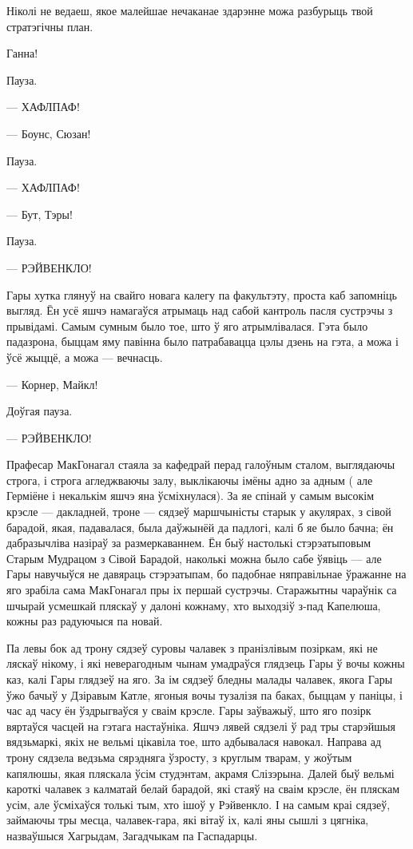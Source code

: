 

\begin{chapterOpeningQuote}
Ніколі не ведаеш, якое
малейшае нечаканае здарэнне можа разбурыць твой стратэгічны план.
\end{chapterOpeningQuote}

 Ганна!

\hplettrineextrapara
Пауза.

--- ХАФЛПАФ!

--- Боунс, Сюзан!

Пауза.

--- ХАФЛПАФ!

--- Бут, Тэры!

Пауза.

--- РЭЙВЕНКЛО!

Гары хутка глянуў на свайго новага калегу па факультэту, проста каб запомніць выгляд.
Ён усё яшчэ намагаўся атрымаць над сабой кантроль пасля сустрэчы з прывідамі. 
Самым сумным было тое, што ў яго атрымлівалася. Гэта было падазрона,
быццам яму павінна было патрабавацца цэлы дзень на гэта, а можа і ўсё жыццё, а можа --- вечнасць.


--- Корнер, Майкл!

Доўгая пауза.

--- РЭЙВЕНКЛО!

Прафесар МакГонагал стаяла за кафедрай перад галоўным сталом, выглядаючы
строга, і строга агледжваючы залу, выклікаючы імёны адно за адным (%
але Герміёне і некалькім яшчэ яна ўсміхнулася).
За яе спінай у самым высокім крэсле --- дакладней, троне --- 
сядзеў маршчыністы старык у акулярах, з сівой барадой, якая, падавалася,
была даўжынёй да падлогі, калі б яе было бачна; ён дабразычліва назіраў за 
размеркаваннем. Ён быў настолькі стэрэатыповым Старым Мудрацом
з Сівой Барадой, наколькі можна было сабе ўявіць --- але Гары навучыўся не 
давяраць стэрэатыпам, бо падобнае няправільнае ўражанне на яго зрабіла сама 
МакГонагал пры іх першай сустрэчы. 
Старажытны чараўнік са шчырай усмешкай пляскаў у далоні кожнаму, хто выходзіў 
з-пад Капелюша, кожны раз радуючыся па новай.

Па левы бок ад трону сядзеў суровы чалавек з пранізлівым позіркам, які не 
ляскаў нікому, і які неверагодным чынам умадраўся глядзець 
Гары ў вочы кожны каз, калі Гары глядзеў на яго. За ім сядзеў
бледны малады чалавек, якога Гары ўжо бачыў у Дзіравым Катле, ягоныя вочы
тузалізя па баках, быццам у паніцы, і час ад часу ён ўздрыгваўся у сваім 
крэсле. Гары заўважыў, што яго позірк вяртаўся часцей на гэтага настаўніка.
Яшчэ лявей сядзелі ў рад тры старэйшыя вядзьмаркі, якіх не вельмі цікавіла 
тое, што адбывалася навокал. Направа ад трону сядзела ведзьма сярэдняга ўзросту,
з круглым тварам, у жоўтым капялюшы, якая пляскала ўсім студэнтам, акрамя 
Слізэрына. Далей быў вельмі кароткі чалавек з калматай
белай барадой, які стаяў на сваім крэсле, ён пляскам усім, але ўсміхаўся толькі
тым, хто ішоў у Рэйвенкло. І на самым краі сядзеў, займаючы тры месца, чалавек-гара, які вітаў іх, калі яны сышлі з цягніка, назваўшыся Хагрыдам, Загадчыкам па
Гаспадарцы.

